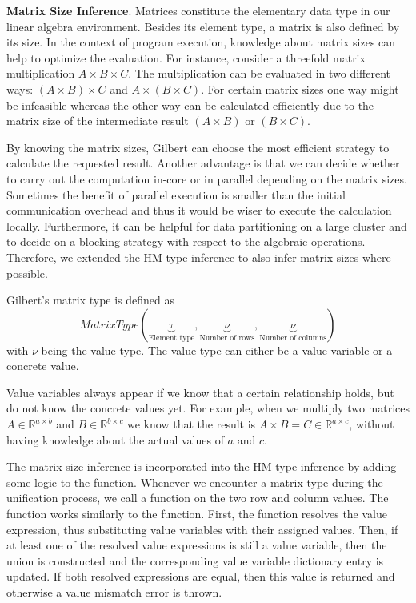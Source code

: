 
\textbf{Matrix Size Inference}. Matrices constitute the elementary data type in our linear algebra environment.
Besides its element type, a matrix is also defined by its size.
In the context of program execution, knowledge about matrix sizes can help to optimize the evaluation.
For instance, consider a threefold matrix multiplication $A\times B\times C$.
The multiplication can be evaluated in two different ways: $(A\times B)\times C$ and $A\times(B\times C)$.
For certain matrix sizes one way might be infeasible whereas the other way can be calculated efficiently due to the matrix size of the intermediate result $(A\times B)$ or $(B\times C)$.

By knowing the matrix sizes, Gilbert can choose the most efficient strategy to calculate the requested result.
Another advantage is that we can decide whether to carry out the computation in-core or in parallel depending on the matrix sizes.
Sometimes the benefit of parallel execution is smaller than the initial communication overhead and thus it would be wiser to execute the calculation locally.
Furthermore, it can be helpful for data partitioning on a large cluster and to decide on a blocking strategy with respect to the algebraic operations.
Therefore, we extended the HM type inference to also infer matrix sizes where possible.

Gilbert's matrix type is defined as 
\begin{displaymath}
MatrixType(\underbrace{\tau}_{\text{Element type}},\underbrace{\nu}_{\text{Number of rows}},\underbrace{\nu}_{\text{Number of columns}})
\end{displaymath}
with $\nu$ being the value type. The value type can either be a value variable or a concrete value.

Value variables always appear if we know that a certain relationship holds, but do not know the concrete values yet.
For example, when we multiply two matrices $A\in\mathbb{R}^{a\times b}$ and $B\in\mathbb{R}^{b\times c}$ we know that the result is $A\times B = C \in \mathbb{R}^{a\times c}$, without having knowledge about the actual values of $a$ and $c$.

The matrix size inference is incorporated into the HM type inference by adding some logic to the  function.
Whenever we encounter a matrix type during the unification process, we call a  function on the two row and column values.
The  function works similarly to the  function.
First, the function resolves the value expression, thus substituting value variables with their assigned values.
Then, if at least one of the resolved value expressions is still a value variable, then the union is constructed and the corresponding value variable dictionary entry is updated.
If both resolved expressions are equal, then this value is returned and otherwise a value mismatch error is thrown.

